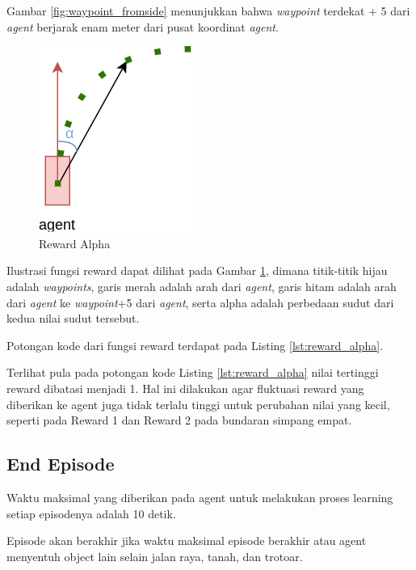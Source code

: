 Gambar \ref{fig:waypoint_fromside} menunjukkan bahwa \textit{waypoint} terdekat + 5 dari \textit{agent} berjarak enam meter dari pusat koordinat \textit{agent}.

\begin{figure}[H] 
	\centering
	\includegraphics[width=.5\linewidth]{images/reward_alpha}
	\caption{Reward Alpha}
	\label{fig:reward_alpha}
\end{figure}

Ilustrasi fungsi reward dapat dilihat pada Gambar \ref{fig:reward_alpha}, dimana titik-titik hijau adalah \textit{waypoints}, garis merah adalah arah dari \textit{agent}, garis hitam adalah arah dari \textit{agent} ke \textit{waypoint}+5 dari \textit{agent}, serta alpha adalah perbedaan sudut dari kedua nilai sudut tersebut.

Potongan kode dari fungsi reward terdapat pada Listing \ref{lst:reward_alpha}.



Terlihat pula pada potongan kode Listing \ref{lst:reward_alpha} nilai tertinggi reward dibatasi menjadi 1. Hal ini dilakukan agar fluktuasi reward yang diberikan ke agent juga tidak terlalu tinggi untuk perubahan nilai yang kecil, seperti pada Reward 1 dan Reward 2 pada bundaran simpang empat.


\subsection{End Episode}
\label{sec:end_episode}
Waktu maksimal yang diberikan pada agent untuk melakukan proses learning setiap episodenya adalah 10 detik.

Episode akan berakhir jika waktu maksimal episode berakhir atau agent menyentuh object lain selain jalan raya, tanah, dan trotoar.

